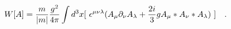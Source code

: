 \begin{equation}
W[A] = \frac{m}{|m|} \frac{g^2}{4\pi} \int d^3x
[~\epsilon^{\mu\nu\lambda}(A_{\mu}\partial_{\nu}A_{\lambda}
+ \frac{2i}{3}g A_{\mu}*A_{\nu}*A_{\lambda})~] ~~~.\\ 
\end{equation}

